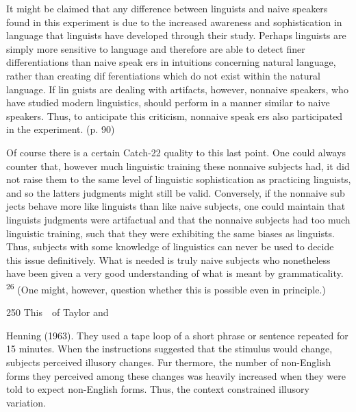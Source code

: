 \begin{styleTextbody}
It might be claimed that any difference between linguists and naive speakers found in this experiment is due to the increased awareness and sophistication in language that linguists have developed through their study. Perhaps linguists are simply more sensitive to language and therefore are able to detect finer differentiations than naive speak\- ers in intuitions concerning natural language, rather than creating dif\- ferentiations which do not exist within the natural language. If lin\- guists are dealing with artifacts, however, nonnaive speakers, who have studied modern linguistics, should perform in a manner similar to naive speakers. Thus, to anticipate this criticism, nonnaive speak\- ers also participated in the experiment. (p. 90)
\end{styleTextbody}


\begin{styleTextbody}
Of course there is a certain Catch-22 quality to this last point. One could always counter that, however much linguistic training these nonnaive subjects had, it did not raise them to the same level of linguistic sophistication as practicing linguists, and so the latter{\textquotesingle}s judgments might still be valid. Conversely, if the nonnaive sub\- jects behave more like linguists than like naive subjects, one could maintain that linguists{\textquotesingle} judgments were artifactual and that the nonnaive subjects had too much linguistic training, such that they were exhibiting the same biases as linguists. Thus, subjects with some knowledge of linguistics can never be used to decide this issue definitively. What is needed is truly naive subjects who nonetheless have been given a very good understanding of what is meant by grammaticality. \textsuperscript{26}\textsuperscript{ }(One might, however, question whether this is possible even in principle.)
\end{styleTextbody}


\begin{styleStandard}
250 This\ \ of Taylor and
\end{styleStandard}


\begin{styleStandard}
Henning (1963). They used a tape loop of a short phrase or sentence repeated for 15 minutes. When the instructions suggested that the stimulus would change, subjects perceived illusory changes. Fur\- thermore, the number of non-English forms they perceived among these changes was heavily increased when they were told to expect non-English forms. Thus, the context constrained illusory variation.
\end{styleStandard}



